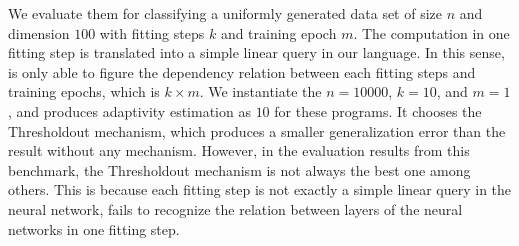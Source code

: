 We evaluate them for classifying a uniformly generated data set of size $n$ and dimension $100$ with fitting steps
$k$ and training epoch $m$.
The computation in one fitting step is translated into a simple linear query in our language.
In this sense, {\THESYSTEM} is only able to figure the dependency relation between each fitting steps and
training epochs, which is $k \times m$.
We instantiate the $n = 10000$, $k = 10$, and $m = 1$,
and {\THESYSTEM} produces adaptivity estimation as $10$ for these programs.
It chooses the Thresholdout mechanism, which produces a smaller generalization error than the result without any mechanism.
However, in the evaluation results from this benchmark, the Thresholdout mechanism is not always the best one among others.
This is because each fitting step is not exactly a simple linear query in the neural network,
{\THESYSTEM} fails to recognize the relation between layers of the neural networks in one fitting step.

